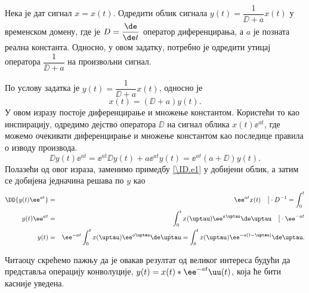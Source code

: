 \PID Нека је дат сигнал $x = x(t)$. Одредити облик сигнала $y(t) = \dfrac{1}{\DD + a}x(t)$ у временском домену, где је 
$D = \dfrac{\de}{\de t}$ оператор диференцирања, а $a$ је позната реална константа. Односно, у овом задатку, потребно је 
одредити утицај оператора $\dfrac{1}{\DD + a}$ на произвољни сигнал.

\RESENJE
По услову задатка је 
$y(t) = \dfrac{1}{\DD + a}x(t)$, 
 односно је 
\begin{equation}
x(t) = (\DD + a) y(t). \label{\ID.e1}
\end{equation} 
У овом изразу постоје диференцирање и множење константом. Користећи то као инспирацију, одредимо дејство 
оператора $\DD$ на сигнал облика $x(t) \ee^{at}$, где можемо очекивати диференцирање и множење константом као последице правила о изводу производа. 
\begin{equation}
    \DD{ y(t) \ee^{at} } = \ee^{at} \DD y(t) + a \ee^{at} y(t) = \ee^{at} (a + \DD) y(t).
\end{equation}
Полазећи од овог израза, заменимо примедбу \ref{\ID.e1} у добијени облик, а затим се добијена једначина решава по $y$ као 
\begin{eqnarray}
    \DD{ y(t) \ee^{at} } &=& \ee^{at} x(t) \quad \big| \cdot D^{-1} = \int_{0}^{t} \\
    y(t) \ee^{at} &=& \int_{0}^{t} x(\uptau) \ee^{a\uptau}\de \uptau \quad \big| \cdot \ee^{-at} \\
    y(t) &=& \ee^{-at} \int_{0}^{t} x(\uptau) \ee^{a\uptau}\de \uptau = 
         \int_{0}^{t} x(\uptau) \ee^{-a(t - \uptau) }  \de \uptau.
\end{eqnarray}

Читаоцу скрећемо пажњу да је овакав резултат од великог интереса будући да представља операцију конволуције, 
$y(t) = x(t) \ast \ee^{-at} \uu(t)$, која ће бити касније уведена. 
